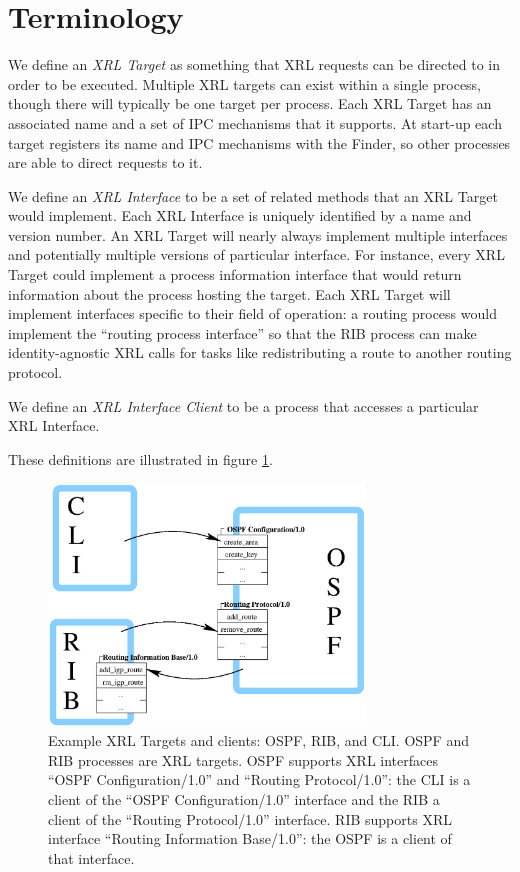\documentclass[11pt]{article}
\begin{document}
\section{Terminology}

We define an \emph{XRL Target} as something that XRL requests can be
directed to in order to be executed.  Multiple XRL targets can
exist within a single process, though there will typically be one
target per process.  Each XRL Target has an associated name and a set
of IPC mechanisms that it supports.  At start-up each target registers
its name and IPC mechanisms with the Finder, so other processes are
able to direct requests to it.

We define an \emph{XRL Interface} to be a set of related methods that
an XRL Target would implement.  Each XRL Interface is uniquely
identified by a name and version number.  An XRL Target will nearly
always implement multiple interfaces and potentially multiple versions
of particular interface.  For instance, every XRL Target could
implement a process information interface that would return
information about the process hosting the target.  Each XRL Target
will implement interfaces specific to their field of operation: a
routing process would implement the ``routing process interface'' so
that the RIB process can make identity-agnostic XRL calls for tasks
like redistributing a route to another routing protocol.

We define an \emph{XRL Interface Client} to be a process that accesses
a particular XRL Interface.

These definitions are illustrated in figure \ref{fig:eg-interfaces}.

\begin{figure}
  \begin{center}
    \includegraphics[width=0.75\textwidth]{figs/xrl_ifs}
  \end{center}
  \caption{Example XRL Targets and clients: OSPF, RIB, and CLI.
OSPF and RIB processes are XRL targets.  OSPF supports XRL interfaces
``OSPF Configuration/1.0'' and ``Routing Protocol/1.0'': the CLI is a
client of the ``OSPF Configuration/1.0'' interface and the RIB a client
of the ``Routing Protocol/1.0'' interface.  RIB supports XRL interface
``Routing Information Base/1.0'': the OSPF is a client of that interface.
}
  \label{fig:eg-interfaces}
\end{figure}
\end{document}
